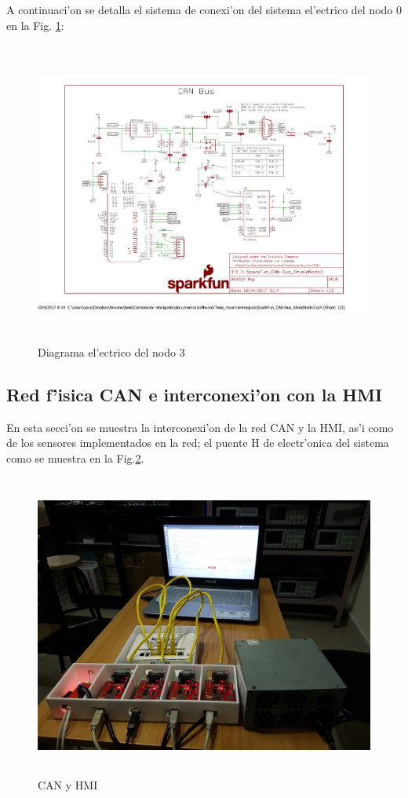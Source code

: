 A continuaci'on se detalla el sistema de conexi'on del sistema el'ectrico del nodo 0 en la Fig. \ref{fig:nodo3electric}:

\begin{center}
\begin{figure}[ht]
	\centering
		\includegraphics[width=14cm, height=10cm]{nodo3e}
	\caption{Diagrama el'ectrico del nodo 3}
	\label{fig:nodo3electric}
\end{figure}
\end{center}

\subsection{Red f'isica CAN e interconexi'on con la HMI}

En esta secci'on se muestra la interconexi'on de la red CAN y la HMI, as'i como de los sensores implementados en la red; el puente H de electr'onica del sistema como se muestra en la Fig.\ref{fig:canhmi}.
\begin{center}
\begin{figure}[ht]
	\centering
		\includegraphics[width=14cm, height=10cm]{canhmi}
	\caption{CAN y HMI}
	\label{fig:canhmi}
\end{figure}
\end{center}


